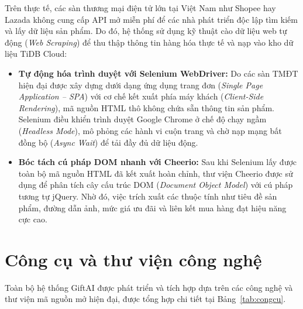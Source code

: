 Trên thực tế, các sàn thương mại điện tử lớn tại Việt Nam như Shopee hay Lazada không cung cấp API mở miễn phí để các nhà phát triển độc lập tìm kiếm và lấy dữ liệu sản phẩm. Do đó, hệ thống sử dụng kỹ thuật cào dữ liệu web tự động (\textit{Web Scraping}) để thu thập thông tin hàng hóa thực tế và nạp vào kho dữ liệu TiDB Cloud:

\begin{itemize}[leftmargin=1.2cm, itemsep=3pt]
    \item \textbf{Tự động hóa trình duyệt với Selenium WebDriver:} Do các sàn TMĐT hiện đại được xây dựng dưới dạng ứng dụng trang đơn (\textit{Single Page Application -- SPA}) với cơ chế kết xuất phía máy khách (\textit{Client-Side Rendering}), mã nguồn HTML thô không chứa sẵn thông tin sản phẩm. Selenium điều khiển trình duyệt Google Chrome ở chế độ chạy ngầm (\textit{Headless Mode}), mô phỏng các hành vi cuộn trang và chờ nạp mạng bất đồng bộ (\textit{Async Wait}) để tải đầy đủ dữ liệu động.
    
    \item \textbf{Bóc tách cú pháp DOM nhanh với Cheerio:} Sau khi Selenium lấy được toàn bộ mã nguồn HTML đã kết xuất hoàn chỉnh, thư viện Cheerio được sử dụng để phân tích cây cấu trúc DOM (\textit{Document Object Model}) với cú pháp tương tự jQuery. Nhờ đó, việc trích xuất các thuộc tính như tiêu đề sản phẩm, đường dẫn ảnh, mức giá ưu đãi và liên kết mua hàng đạt hiệu năng cực cao.
\end{itemize}


\section{Công cụ và thư viện công nghệ}

Toàn bộ hệ thống GiftAI được phát triển và tích hợp dựa trên các công nghệ và thư viện mã nguồn mở hiện đại, được tổng hợp chi tiết tại Bảng~\ref{tab:congcu}.

